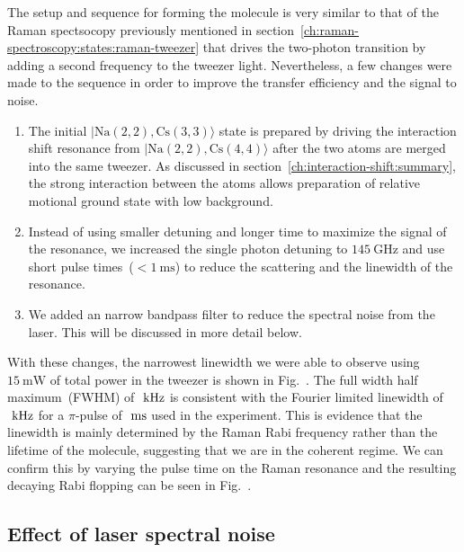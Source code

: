 The setup and sequence for forming the molecule is very similar to that of the Raman spectsocopy
previously mentioned in section~\ref{ch:raman-spectroscopy:states:raman-tweezer}
that drives the two-photon transition by adding a second frequency to the tweezer light.
Nevertheless, a few changes were made to the sequence in order to improve
the transfer efficiency and the signal to noise.
\begin{enumerate}
\item The initial $|\mathrm{Na(2,2),Cs(3,3)}\rangle$ state is prepared by driving the
  interaction shift resonance from $|\mathrm{Na(2,2),Cs(4,4)}\rangle$
  after the two atoms are merged into the same tweezer.
  As discussed in section~\ref{ch:interaction-shift:summary},
  the strong interaction between the atoms allows preparation of
  relative motional ground state with low background.
\item Instead of using smaller detuning and longer time to maximize the signal of the resonance,
  we increased the single photon detuning to $145~\mathrm{GHz}$
  and use short pulse times~($<1~\mathrm{ms}$)
  to reduce the scattering and the linewidth of the resonance.
\item We added an narrow bandpass filter to reduce the spectral noise from the laser.
  This will be discussed in more detail below.
\end{enumerate}

With these changes, the narrowest linewidth we were able to observe using $15~\mathrm{mW}$
of total power in the tweezer is shown in Fig.~.
The full width half maximum~(FWHM) of $\todo{number}~\mathrm{kHz}$ is consistent
with the Fourier limited linewidth of $\todo{number}~\mathrm{kHz}$
for a $\pi$-pulse of $\todo{number}~\mathrm{ms}$ used in the experiment.
This is evidence that the linewidth is mainly determined by the Raman Rabi frequency
rather than the lifetime of the molecule, suggesting that we are in the coherent regime.
We can confirm this by varying the pulse time on the Raman resonance
and the resulting decaying Rabi flopping can be seen in Fig.~.


\subsection{Effect of laser spectral noise}
\label{ch:raman-transfer:results:ase}

